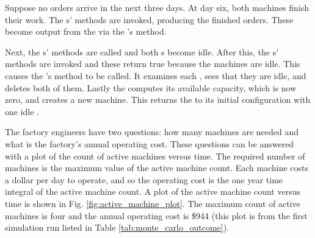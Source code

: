 Suppose no orders arrive in the next three days. At day six, both machines finish their work. The s'  methods are invoked, producing the finished orders. These become output from the  via the 's  method.

Next, the s'  methods are called and both s become idle. After this, the s'  methods are invoked and these return true because the machines are idle. This causes the 's  method to be called. It examines each , sees that they are idle, and deletes both of them. Lastly the  computes its available capacity, which is now zero, and creates a new machine. This returns the  to its initial configuration with one idle .

The factory engineers have two questions: how many machines are needed and what is the factory's annual operating cost. These questions can be answered with a plot of the count of active machines versus time. The required number of machines is the maximum value of the active machine count. Each machine costs a dollar per day to operate, and so the operating cost is the one year time integral of the active machine count. A plot of the active machine count versus time is shown in Fig. \ref{fig:active_machine_plot}. The maximum count of active machines is four and the annual operating cost is \$944 (this plot is from the first simulation run listed in Table \ref{tab:monte_carlo_outcome}).

